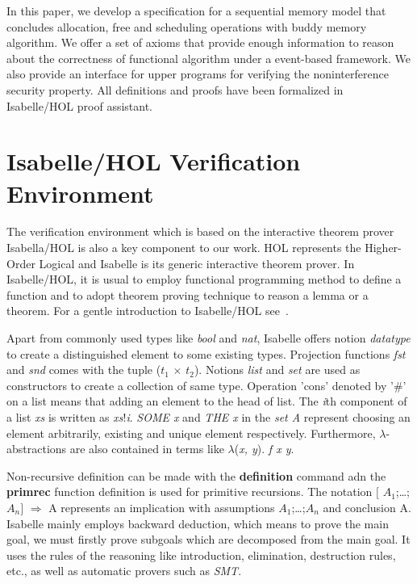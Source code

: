 \documentclass[runningheads]{llncs}
\begin{document}
In this paper, we develop a specification for a sequential memory model that concludes allocation, free and scheduling operations with buddy memory algorithm. We offer a set of axioms that provide enough information to reason about the correctness of functional algorithm under a event-based framework. We also provide an interface for upper programs for 
verifying the noninterference security property. All definitions and proofs have been formalized in Isabelle/HOL proof assistant.


\section{Isabelle/HOL Verification Environment}
The verification environment which is based on the interactive theorem prover Isabella/HOL is also a key component to our work. HOL represents the Higher-Order Logical and Isabelle is its generic interactive theorem prover. In Isabelle/HOL, it is usual to employ functional programming method to define a function and to adopt theorem proving technique to reason a lemma or a theorem. For a gentle introduction to Isabelle/HOL see~\cite{reg_Isabelle/HOL}. 

Apart from commonly used types like \textsl{bool} and \textsl{nat}, Isabelle offers notion \textsl{datatype} to create a distinguished element to some existing types. Projection functions \textsl{fst} and \textsl{snd} comes with the tuple (\textsl{$t_1$} $\times$ \textsl{$t_2$}). Notions \textsl{list} and \textsl{set} are used as constructors to create a collection of same type. Operation 'cons' denoted by '$\#$' on a list means that adding an element to the head of list. The \textsl{i}th component of a list \textsl{xs} is written as \textsl{xs}!\textsl{i}. \textsl{SOME x} and \textsl{THE x} in the \textsl{set A} represent choosing an element arbitrarily, existing and unique element respectively. Furthermore, $\lambda$-abstractions are also contained in terms like $\lambda$(\textsl{x, y}). \textsl{f x y}.

Non-recursive definition can be made with the \textbf{definition} command adn the \textbf{primrec} function definition is used for primitive recursions. The notation $\lbrack$ $A_1$;\dots;$A_n$$\rbrack$ $\Longrightarrow$ A represents an implication with assumptions $A_1$;\dots;$A_n$ and conclusion A. Isabelle mainly employs backward deduction, which means to prove the main goal, we must firstly prove subgoals which are decomposed from the main goal. It uses the rules of the reasoning like introduction, elimination, destruction rules, etc., as well as automatic provers such as \textsl{SMT}.
\end{document}
